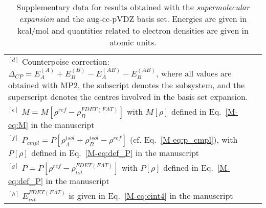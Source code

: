 \documentclass[amsmath,amssymb,preprint,aip,jcp]{revtex4-1}
\begin{document}
\begin{table}[H]
\begin{center}
{\begin{tabular}{|l|l|l|l|l|l|l|l|l|l|}
\multicolumn{10}{p{1.0\textwidth}}{$^{[d]}$ Counterpoise correction: $\Delta_{CP} = E_{A}^{(A)} + E_{B}^{(B)} - E_{A}^{(AB)} - E_{B}^{(AB)}$, where all values are obtained with MP2, the subscript denotes the subsystem, and the superscript denotes the centres involved in the basis set expansion.} \\
\multicolumn{10}{p{1.0\textwidth}}{$^{[e]}$ $M=M[\rho^{ref} - \rho^{FDET(FAT)}_{B}]$ with $M[\rho]$ defined in Eq.~\ref{M-eq:M} in the manuscript}\\
\multicolumn{10}{p{1.0\textwidth}}{$^{[f]}$ $P_{cmpl}=P[\rho_A^{isol}+\rho_B^{isol} - \rho^{ref}]$ (cf. Eq.~\ref{M-eq:p_cmpl}), with $P[\rho]$ defined in Eq.~\ref{M-eq:def_P} in the manuscript}\\
\multicolumn{10}{p{1.0\textwidth}}{$^{[g]}$ $P=P[\rho^{ref} - \rho_{tot}^{FDET(FAT)}]$ with $P[\rho]$ defined in Eq.~\ref{M-eq:def_P} in the manuscript}\\
\multicolumn{10}{p{1.0\textwidth}}{$^{[h]}$ $E^{FDET(FAT)}_{int}$ is given in Eq.~\ref{M-eq:eint4} in the manuscript}\\
\end{tabular}
}
\end{center}
\caption{Supplementary data for results obtained with the \textit{supermolecular expansion} and the aug-cc-pVDZ basis set. Energies are given in kcal/mol and quantities related to electron densities are given in atomic units.}
\end{table}
\end{document}
